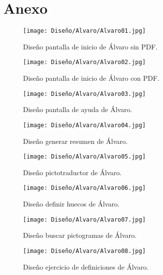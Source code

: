 \chapter{Anexo}
\label{cap:anexo}

\begin{figure}[ht!]
  \centering
  \texttt{[image: Diseño/Alvaro/Alvaro01.jpg]}
  \caption{Diseño pantalla de inicio de Álvaro sin PDF.}
  \label{fig:disenyoAlvaro01}
\end{figure}

\begin{figure}[ht!]
  \centering
  \texttt{[image: Diseño/Alvaro/Alvaro02.jpg]}
  \caption{Diseño pantalla de inicio de Álvaro con PDF.}
  \label{fig:disenyoAlvaro02}
\end{figure}

\begin{figure}[ht!]
  \centering
  \texttt{[image: Diseño/Alvaro/Alvaro03.jpg]}
  \caption{Diseño pantalla de ayuda de Álvaro.}
  \label{fig:disenyoAlvaro03}
\end{figure}

\begin{figure}[ht!]
  \centering
  \texttt{[image: Diseño/Alvaro/Alvaro04.jpg]}
  \caption{Diseño generar resumen de Álvaro.}
  \label{fig:disenyoAlvaro04}
\end{figure}

\begin{figure}[ht!]
  \centering
  \texttt{[image: Diseño/Alvaro/Alvaro05.jpg]}
  \caption{Diseño pictotraductor de Álvaro.}
  \label{fig:disenyoAlvaro05}
\end{figure}

\begin{figure}[ht!]
  \centering
  \texttt{[image: Diseño/Alvaro/Alvaro06.jpg]}
  \caption{Diseño definir huecos de Álvaro.}
  \label{fig:disenyoAlvaro06}
\end{figure}

\begin{figure}[ht!]
  \centering
  \texttt{[image: Diseño/Alvaro/Alvaro07.jpg]}
  \caption{Diseño buscar pictogramas de Álvaro.}
  \label{fig:disenyoAlvaro07}
\end{figure}

\begin{figure}[ht!]
  \centering
  \texttt{[image: Diseño/Alvaro/Alvaro08.jpg]}
  \caption{Diseño ejercicio de definiciones de Álvaro.}
  \label{fig:disenyoAlvaro08}
\end{figure}


